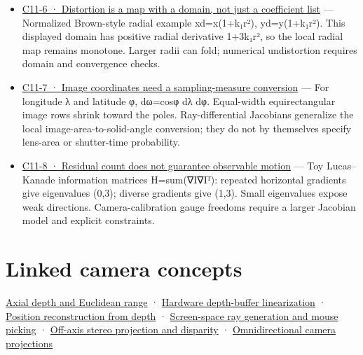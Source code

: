 \begin{itemize}
\item
  \href{Continuous\%20Notes/Computing\%20Foundations\%20-\%20From\%20Bits\%20to\%20C++\%20and\%20Systems\%20APIs\#Figure\%20C11-6\%20—\%20Distortion\%20is\%20a\%20map\%20with\%20a\%20domain,\%20not\%20just\%20a\%20coefficient\%20list}{C11-6 · Distortion is a map with a domain, not just a coefficient list} --- Normalized Brown-style radial example xd=x(1+k₁r²), yd=y(1+k₁r²). This displayed domain has positive radial derivative 1+3k₁r², so the local radial map remains monotone. Larger radii can fold; numerical undistortion requires domain and convergence checks.
\item
  \href{Continuous\%20Notes/Computing\%20Foundations\%20-\%20From\%20Bits\%20to\%20C++\%20and\%20Systems\%20APIs\#Figure\%20C11-7\%20—\%20Image\%20coordinates\%20need\%20a\%20sampling-measure\%20conversion}{C11-7 · Image coordinates need a sampling-measure conversion} --- For longitude λ and latitude φ, dω=cosφ dλ dφ. Equal-width equirectangular image rows shrink toward the poles. Ray-differential Jacobians generalize the local image-area-to-solid-angle conversion; they do not by themselves specify lens-area or shutter-time probability.
\item
  \href{Continuous\%20Notes/Computing\%20Foundations\%20-\%20From\%20Bits\%20to\%20C++\%20and\%20Systems\%20APIs\#Figure\%20C11-8\%20—\%20Residual\%20count\%20does\%20not\%20guarantee\%20observable\%20motion}{C11-8 · Residual count does not guarantee observable motion} --- Toy Lucas--Kanade information matrices H=sum(∇I∇Iᵀ): repeated horizontal gradients give eigenvalues (0,3); diverse gradients give (1,3). Small eigenvalues expose weak directions. Camera-calibration gauge freedoms require a larger Jacobian model and explicit constraints.
\end{itemize}

\section{Linked camera concepts}\label{appendix-a2b71a18f5a2-linked-camera-concepts}

\hyperref[appendix-cac01ebeeb11]{Axial depth and Euclidean range} · \hyperref[appendix-1bc40b08db4a]{Hardware depth-buffer linearization} · \hyperref[appendix-2cbf2968e866]{Position reconstruction from depth} · \hyperref[appendix-f1a6d43e80d1]{Screen-space ray generation and mouse picking} · \hyperref[appendix-0976e86e5b9f]{Off-axis stereo projection and disparity} · \hyperref[appendix-fc99ad39f351]{Omnidirectional camera projections}

